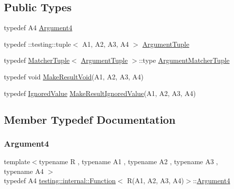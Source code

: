 \subsection*{Public Types}
\begin{DoxyCompactItemize}
\item 
typedef A4 \hyperlink{structtesting_1_1internal_1_1_function_3_01_r_07_a1_00_01_a2_00_01_a3_00_01_a4_08_4_ae5039423598ab0fecd4f594acbf34d85}{Argument4}
\item 
typedef \+::testing\+::tuple$<$ A1, A2, A3, A4 $>$ \hyperlink{structtesting_1_1internal_1_1_function_3_01_r_07_a1_00_01_a2_00_01_a3_00_01_a4_08_4_a8ad9e0ae57a766f80a9816ad45626812}{Argument\+Tuple}
\item 
typedef \hyperlink{structtesting_1_1internal_1_1_matcher_tuple}{Matcher\+Tuple}$<$ \hyperlink{structtesting_1_1internal_1_1_function_3_01_r_07_08_4_ad483c3128c470d8cdb55c3ac1c575c11}{Argument\+Tuple} $>$\+::type \hyperlink{structtesting_1_1internal_1_1_function_3_01_r_07_a1_00_01_a2_00_01_a3_00_01_a4_08_4_a9524b18868ab632a90d4cb6917057a14}{Argument\+Matcher\+Tuple}
\item 
typedef void \hyperlink{structtesting_1_1internal_1_1_function_3_01_r_07_a1_00_01_a2_00_01_a3_00_01_a4_08_4_af7462da27e87a9d580e7f9748ebc5754}{Make\+Result\+Void}(A1, A2, A3, A4)
\item 
typedef \hyperlink{classtesting_1_1internal_1_1_ignored_value}{Ignored\+Value} \hyperlink{structtesting_1_1internal_1_1_function_3_01_r_07_a1_00_01_a2_00_01_a3_00_01_a4_08_4_a6736086d1c8ba25788add1e5180207f9}{Make\+Result\+Ignored\+Value}(A1, A2, A3, A4)
\end{DoxyCompactItemize}


\subsection{Member Typedef Documentation}
\mbox{\label{structtesting_1_1internal_1_1_function_3_01_r_07_a1_00_01_a2_00_01_a3_00_01_a4_08_4_ae5039423598ab0fecd4f594acbf34d85}} 
\subsubsection{\texorpdfstring{Argument4}{Argument4}}
{\footnotesize\ttfamily template$<$typename R , typename A1 , typename A2 , typename A3 , typename A4 $>$ \\
typedef A4 \hyperlink{structtesting_1_1internal_1_1_function}{testing\+::internal\+::\+Function}$<$ R(A1, A2, A3, A4)$>$\+::\hyperlink{structtesting_1_1internal_1_1_function_3_01_r_07_a1_00_01_a2_00_01_a3_00_01_a4_08_4_ae5039423598ab0fecd4f594acbf34d85}{Argument4}}

